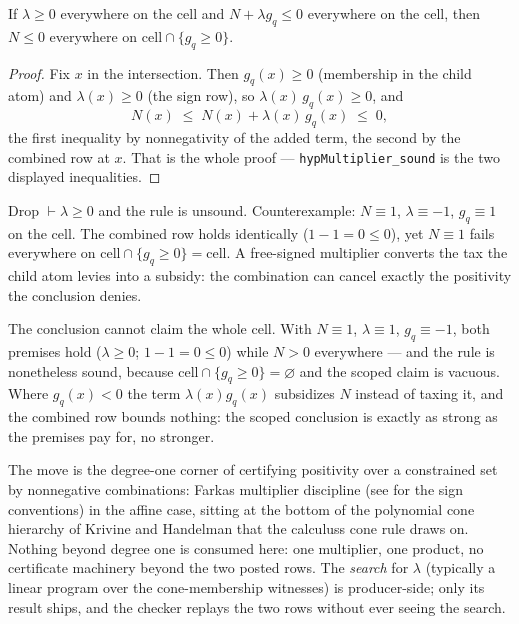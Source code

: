 \begin{bprop}\label{prop:hm-sound}
If $\lambda \ge 0$ everywhere on the cell and $N + \lambda g_q \le 0$
everywhere on the cell, then $N \le 0$ everywhere on
$\mathrm{cell} \cap \{g_q \ge 0\}$.
\end{bprop}
\begin{proof}
Fix $x$ in the intersection. Then $g_q(x) \ge 0$ (membership in the
child atom) and $\lambda(x) \ge 0$ (the sign row), so
$\lambda(x)\, g_q(x) \ge 0$, and
\[
N(x) \;\le\; N(x) + \lambda(x)\, g_q(x) \;\le\; 0,
\]
the first inequality by nonnegativity of the added term, the second by
the combined row at $x$. That is the whole proof ---
\texttt{hypMultiplier\_sound} is the two displayed inequalities.
\end{proof}

\begin{bremark}
Drop $\vdash \lambda \ge 0$ and the rule is unsound. Counterexample:
$N \equiv 1$, $\lambda \equiv -1$, $g_q \equiv 1$ on the cell. The
combined row holds identically ($1 - 1 = 0 \le 0$), yet $N \equiv 1$
fails everywhere on $\mathrm{cell} \cap \{g_q \ge 0\} = \mathrm{cell}$.
A free-signed multiplier converts the tax the child atom levies into a
subsidy: the combination can cancel exactly the positivity the
conclusion denies.
\end{bremark}

\begin{bremark}
The conclusion cannot claim the whole cell. With $N \equiv 1$,
$\lambda \equiv 1$, $g_q \equiv -1$, both premises hold
($\lambda \ge 0$; $1 - 1 = 0 \le 0$) while $N > 0$ everywhere --- and
the rule is nonetheless sound, because
$\mathrm{cell} \cap \{g_q \ge 0\} = \varnothing$ and the scoped claim
is vacuous. Where $g_q(x) < 0$ the term $\lambda(x) g_q(x)$ subsidizes
$N$ instead of taxing it, and the combined row bounds nothing: the
scoped conclusion is exactly as strong as the premises pay for, no
stronger.
\end{bremark}

\begin{bremark}
The move is the degree-one corner of certifying positivity over a
constrained set by nonnegative combinations: Farkas\textquotesingle{}
multiplier discipline \cite{farkas1902} (see \cite{schrijver1986} for
the sign conventions) in the affine case, sitting at the bottom of the
polynomial cone hierarchy of Krivine \cite{krivine1964} and Handelman
\cite{handelman1988} that the calculus\textquotesingle s cone rule
draws on. Nothing beyond degree one is consumed here: one multiplier,
one product, no certificate machinery beyond the two posted rows. The
\emph{search} for $\lambda$ (typically a linear program over the
cone-membership witnesses) is producer-side; only its result ships,
and the checker replays the two rows without ever seeing the search.
\end{bremark}

